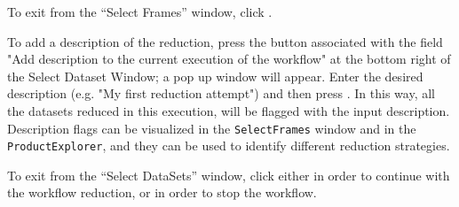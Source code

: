 To exit from the ``Select Frames'' window, click .

To add a description of the reduction, press the button 
associated with the field "Add description to the current execution
  of the workflow" at the bottom right of the Select Dataset Window; a
  pop up window will appear. Enter the desired description (e.g. "My
  first reduction attempt") and then press .
  In this way, all the datasets reduced in this execution, will be
  flagged with the input description. Description flags can be
  visualized in the {\tt SelectFrames} window and in the {\tt ProductExplorer},
  and they can be used to identify different reduction strategies.


To exit from the ``Select DataSets'' window, click either 
in order to continue with the workflow reduction, or  in
order to stop the workflow.


